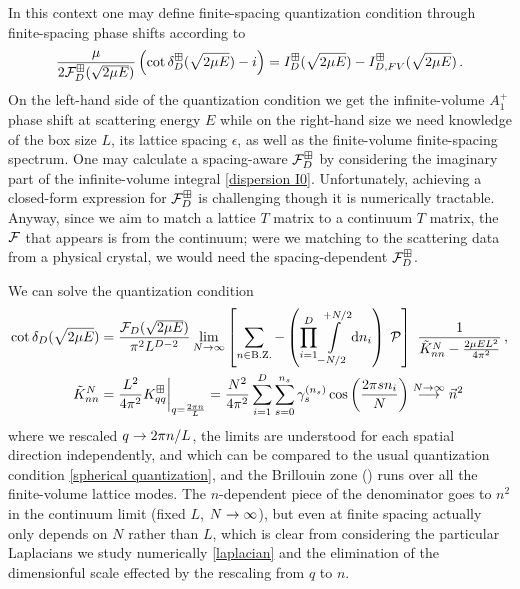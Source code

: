 In this context one may define finite-spacing quantization condition through finite-spacing phase shifts according to
\begin{equation}
    \frac{\mu}{2 \mathcal{F}_D^\boxplus(\sqrt{2\mu E})}\left(\cot\delta_D^\boxplus(\sqrt{2\mu E})-i\right)
    =
    I_D^{\boxplus}(\sqrt{2\mu E}) - I_{D,FV}^{\boxplus}(\sqrt{2\mu E})
	\, .
\end{equation}
On the left-hand side of the quantization condition we get the infinite-volume $A_1^+$ phase shift at scattering energy $E$ while on the right-hand size we need knowledge of the box size $L$, its lattice spacing $\epsilon$, as well as the finite-volume finite-spacing spectrum.
One may calculate a spacing-aware $\mathcal{F}_D^\boxplus$ by considering the imaginary part of the infinite-volume integral \eqref{dispersion I0}.
Unfortunately, achieving a closed-form expression for $\mathcal{F}_D^\boxplus$ is challenging though it is numerically tractable.
Anyway, since we aim to match a lattice $T$ matrix to a continuum $T$ matrix, the $\mathcal{F}$ that appears is from the continuum; were we matching to the scattering data from a physical crystal, we would need the spacing-dependent $\mathcal{F}_D^\boxplus$.

We can solve the quantization condition
\begin{align}
    \cot \delta_D(\sqrt{2 \mu E})
    &=
    \frac{\mathcal{F}_D(\sqrt{2 \mu E})}{\pi^2 L^{D-2}}
    \lim_{N\rightarrow\infty}
    \left[
    	\sum_{n\in\text{B.Z.}} -
		\left(\prod_{i=1}^D
    		\int\limits_{-N/2}^{+N/2}
    		\mathrm{d} n_i
    	\right)\; \mathcal{P} 
	\right]\  \frac{1}{\tilde K_{nn}^{N}-\frac{2\mu E L^2}{4\pi^2}}
	\, , \\
	\tilde K_{nn}^{N}
	&= \frac{L^2}{4\pi^2} K_{qq}^{\boxplus} \bigg|_{q=\frac{2\pi n}{L}}
	= \frac{N^2}{4\pi^2}
    \sum_{i=1}^{D}\sum_{s=0}^{{n_s}} \gamma_s^{({n_s})} \cos\left(\frac{2 \pi s n_i}{N}\right)
    \overset{N \to \infty}{\longrightarrow} \vec n^2
\end{align}
where we rescaled $q\rightarrow 2\pi n/L$, the limits are understood for each spatial direction independently, and which can be compared to the usual quantization condition \eqref{spherical quantization}, and the Brillouin zone (\BZ) runs over all the finite-volume lattice modes.
The $n$-dependent piece of the denominator goes to $n^2$ in the continuum limit (fixed $L$, $N\rightarrow\infty$), but even at finite spacing actually only depends on $N$ rather than $L$, which is clear from considering the particular Laplacians we study numerically \eqref{laplacian} and the elimination of the dimensionful scale effected by the rescaling from $q$ to $n$.

